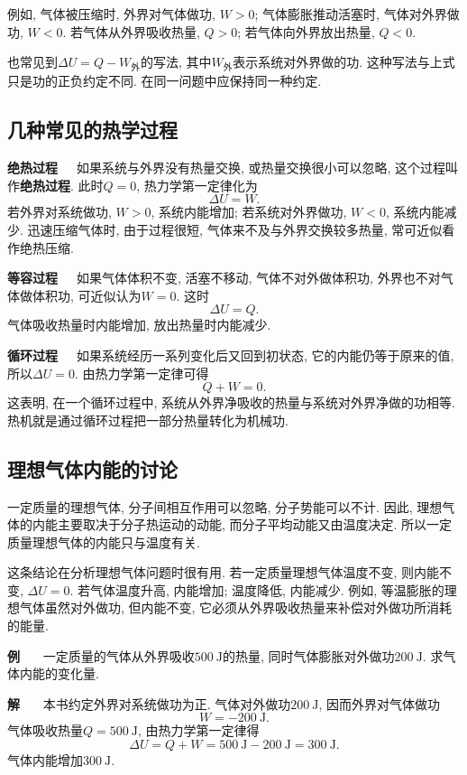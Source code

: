 \documentclass[11pt,a4paper]{ctexbook}
\newcounter{exam}[chapter]
\newcommand{\bre}{\ \ \ }
\newcommand{\examlabel}{\textbf{例\theexam}}
\newcommand{\soln}{\textbf{解}\bre}
\newcommand{\unit}[1]{\ \mathrm{#1}}
\newenvironment{example}{\bigskip\par\refstepcounter{exam}\examlabel\bre}{\par}
\newenvironment{solution}{\par\soln}{\par\bigskip}
\begin{document}
例如, 气体被压缩时, 外界对气体做功, $W>0$; 气体膨胀推动活塞时, 气体对外界做功, $W<0$.
若气体从外界吸收热量, $Q>0$; 若气体向外界放出热量, $Q<0$.

也常见到$\Delta U=Q-W_\text{外}$的写法, 其中$W_\text{外}$表示系统对外界做的功.
这种写法与上式只是功的正负约定不同. 在同一问题中应保持同一种约定.

\subsection{几种常见的热学过程}

\textbf{绝热过程}\bre 如果系统与外界没有热量交换, 或热量交换很小可以忽略, 这个过程叫作\textbf{绝热过程}.
此时$Q=0$, 热力学第一定律化为
$$\Delta U=W.$$
若外界对系统做功, $W>0$, 系统内能增加; 若系统对外界做功, $W<0$, 系统内能减少.
迅速压缩气体时, 由于过程很短, 气体来不及与外界交换较多热量, 常可近似看作绝热压缩.

\textbf{等容过程}\bre 如果气体体积不变, 活塞不移动, 气体不对外做体积功, 外界也不对气体做体积功,
可近似认为$W=0$. 这时
$$\Delta U=Q.$$
气体吸收热量时内能增加, 放出热量时内能减少.

\textbf{循环过程}\bre 如果系统经历一系列变化后又回到初状态, 它的内能仍等于原来的值, 所以$\Delta U=0$.
由热力学第一定律可得
$$Q+W=0.$$
这表明, 在一个循环过程中, 系统从外界净吸收的热量与系统对外界净做的功相等. 热机就是通过循环过程把一部分热量转化为机械功.

\subsection{理想气体内能的讨论}

一定质量的理想气体, 分子间相互作用可以忽略, 分子势能可以不计. 因此, 理想气体的内能主要取决于分子热运动的动能,
而分子平均动能又由温度决定. 所以一定质量理想气体的内能只与温度有关.

这条结论在分析理想气体问题时很有用. 若一定质量理想气体温度不变, 则内能不变, $\Delta U=0$.
若气体温度升高, 内能增加; 温度降低, 内能减少. 例如, 等温膨胀的理想气体虽然对外做功,
但内能不变, 它必须从外界吸收热量来补偿对外做功所消耗的能量.

\begin{example}
一定质量的气体从外界吸收$500\unit{J}$的热量, 同时气体膨胀对外做功$200\unit{J}$.
求气体内能的变化量.
\end{example}
\begin{solution}
本书约定外界对系统做功为正. 气体对外做功$200\unit{J}$, 因而外界对气体做功
$$W=-200\unit{J}.$$
气体吸收热量$Q=500\unit{J}$, 由热力学第一定律得
$$\Delta U=Q+W=500\unit{J}-200\unit{J}=300\unit{J}.$$
气体内能增加$300\unit{J}$.
\end{solution}
\end{document}
